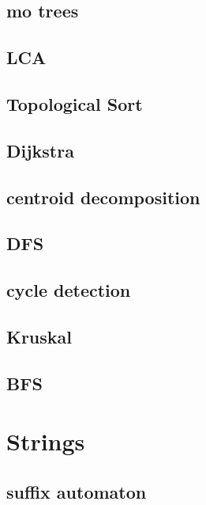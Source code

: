 \subsection{mo trees}
\raggedbottom
\hrulefill
\subsection{LCA}
\raggedbottom
\hrulefill
\subsection{Topological Sort}
\raggedbottom
\hrulefill
\subsection{Dijkstra}
\raggedbottom
\hrulefill
\subsection{centroid decomposition}
\raggedbottom
\hrulefill
\subsection{DFS}
\raggedbottom
\hrulefill
\subsection{cycle detection}
\raggedbottom
\hrulefill
\subsection{Kruskal}
\raggedbottom
\hrulefill
\subsection{BFS}
\raggedbottom
\hrulefill

\section{Strings}
\subsection{suffix automaton}
\raggedbottom
\hrulefill
